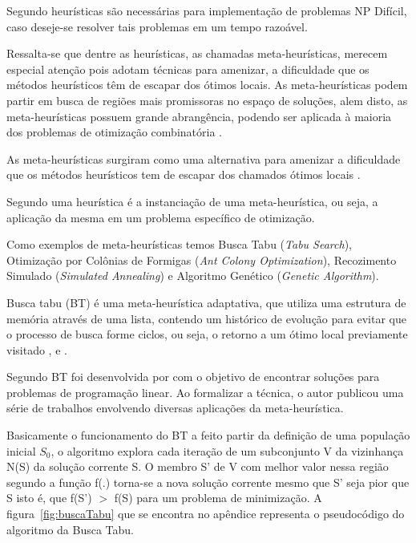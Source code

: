 Segundo \cite{evans1992optimization} heurísticas são necessárias para implementação de problemas NP Difícil, caso deseje-se resolver tais problemas em um tempo  razoável.\par

Ressalta-se que dentre as heurísticas, as chamadas meta-heurísticas, merecem especial atenção pois adotam técnicas para amenizar, a dificuldade que os métodos heurísticos têm de escapar dos ótimos locais. As meta-heurísticas podem partir em busca de regiões mais promissoras no espaço de soluções, alem disto, as meta-heurísticas possuem grande abrangência, podendo ser aplicada à maioria dos problemas de otimização combinatória \cite{nascimento2005aplicaccao}.\par

As meta-heurísticas surgiram como uma alternativa para amenizar a dificuldade que os métodos heurísticos tem de escapar dos chamados ótimos locais \cite{nascimento2005aplicaccao}.

Segundo \cite{adrianocesar} uma heurística é a instanciação de uma meta-heurística, ou seja, a aplicação da mesma em um problema específico de otimização.\par

Como exemplos de meta-heurísticas temos Busca Tabu (\textit{Tabu Search}), Otimização por Colônias de Formigas (\textit{Ant Colony Optimization}), Recozimento Simulado (\textit{Simulated Annealing}) e Algoritmo Genético (\textit{Genetic Algorithm}).\par


Busca tabu (BT) é uma meta-heurística adaptativa, que utiliza uma estrutura de memória através de uma lista, contendo um histórico de evolução para evitar que o processo de busca forme ciclos, ou seja, o retorno a um ótimo local previamente visitado \cite{souza2000} , \cite{armentanointroduccao} e \cite{subramanian2006aplicaccao}.\par


Segundo \cite{subramanian2006aplicaccao} BT foi desenvolvida por \cite{glover1986future} com o objetivo de encontrar soluções para problemas de programação linear. Ao formalizar a técnica, o autor publicou uma série de trabalhos envolvendo diversas aplicações da meta-heurística. \par

Basicamente o funcionamento do BT a feito partir da definição de uma população inicial ${S_0}$, o algoritmo explora cada iteração de um subconjunto V da vizinhança N(S) da solução corrente S. O membro S’ de V com melhor valor nessa região segundo a função f(.) torna-se a nova solução corrente mesmo que S’ seja pior que S isto é, que f(S’) $>$ f(S) para um problema de minimização\cite{souza2000}. A figura~\ref{fig:buscaTabu} que se encontra no apêndice representa o pseudocódigo do algoritmo da Busca Tabu.

